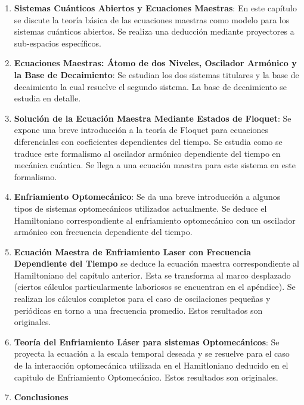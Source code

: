 \documentclass[a4paper,10pt]{report}
\begin{document}
\begin{enumerate}
\item \textbf{Sistemas Cuánticos Abiertos y Ecuaciones Maestras}: En este capítulo se discute la teoría básica de las ecuaciones maestras como modelo para los sistemas cuánticos abiertos. Se realiza una deducción mediante proyectores a sub-espacios específicos.

\item \textbf{Ecuaciones Maestras: Átomo de dos Niveles, Oscilador Armónico y la Base de Decaimiento}: Se estudian los dos sistemas titulares y la base de decaimiento la cual resuelve el segundo sistema. La base de decaimiento se estudia en detalle.

\item \textbf{Solución de la Ecuación Maestra Mediante Estados de Floquet}: Se expone una breve introducción a la teoría de Floquet para ecuaciones diferenciales con coeficientes dependientes del tiempo. Se estudia como se traduce este formalismo al oscilador armónico dependiente del tiempo en mecánica cuántica. Se llega a una ecuación maestra para este sistema en este formalismo.

\item \textbf{Enfriamiento Optomecánico}: Se da una breve introducción a algunos tipos de sistemas optomecánicos utilizados actualmente. Se deduce el Hamiltoniano correspondiente al enfriamiento optomecánico con un oscilador armónico con frecuencia dependiente del tiempo.

\item \textbf{Ecuación Maestra de Enfriamiento Laser con Frecuencia Dependiente del Tiempo} se deduce la ecuación maestra correspondiente al Hamiltoniano del capítulo anterior. Esta se transforma al marco desplazado (ciertos cálculos particularmente laboriosos se encuentran en el apéndice). Se realizan los cálculos completos para el caso de oscilaciones pequeñas y periódicas en torno a una frecuencia promedio. Estos resultados son originales.

\item \textbf{Teoría del Enfriamiento Láser para sistemas Optomecánicos}: Se proyecta la ecuación a la escala temporal deseada y se resuelve para el caso de la interacción optomecánica utilizada en el Hamitloniano deducido en el capitulo de Enfriamiento Optomecánico. Estos resultados son originales.

\item \textbf{Conclusiones}

\end{enumerate}
\end{document}
